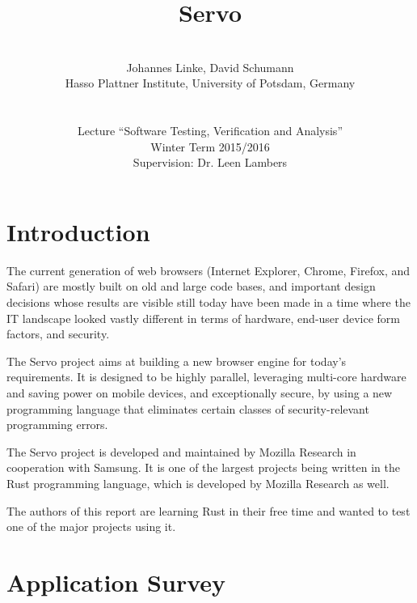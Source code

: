 \documentclass{scrartcl}
\begin{document}
\title{Servo}
\author{\\ Johannes Linke, David Schumann\\ Hasso Plattner Institute, University of Potsdam, Germany\\ \\ \\
Lecture ``Software Testing, Verification and Analysis''\\ Winter Term 2015/2016\\ Supervision: Dr. Leen Lambers \vspace{320px}}

\maketitle
\thispagestyle{empty}

\newpage

\tableofcontents

\newpage



\section{Introduction}

The current generation of web browsers (Internet Explorer, Chrome, Firefox, and Safari) are mostly built on old and large code bases, and important design decisions whose results are visible still today have been made in a time where the IT landscape looked vastly different in terms of hardware, end-user device form factors, and security.

The Servo project aims at building a new browser engine for today's requirements. It is designed to be highly parallel, leveraging multi-core hardware and saving power on mobile devices, and exceptionally secure, by using a new programming language that eliminates certain classes of security-relevant programming errors.

The Servo project is developed and maintained by Mozilla Research in cooperation with Samsung. It is one of the largest projects being written in the Rust programming language, which is developed by Mozilla Research as well.

The authors of this report are learning Rust in their free time and wanted to test one of the major projects using it.


\newpage


\section{Application Survey}
\end{document}
